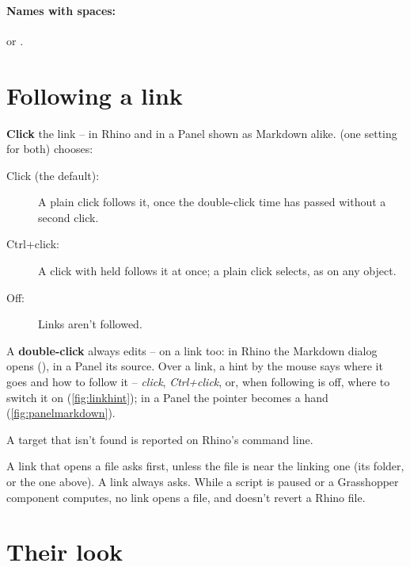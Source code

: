 \paragraph{Names with spaces:}  or .

\section{Following a link}

\textbf{Click} the link -- in Rhino and in a Panel shown as Markdown alike.  (one setting for both) chooses:

\begin{description}
  \item[Click (the default):] A plain click follows it, once the double-click time has passed without a second click.
  \item[Ctrl+click:] A click with  held follows it at once; a plain click selects, as on any object.
  \item[Off:] Links aren't followed.
\end{description}

A \textbf{double-click} always edits -- on a link too: in Rhino the Markdown dialog opens (), in a
Panel its source. Over a link, a hint by the mouse says where it goes and how to follow it -- \emph{click}, \emph{Ctrl+click},
or, when following is off, where to switch it on (\cref{fig:linkhint}); in a Panel the pointer becomes a hand
(\cref{fig:panelmarkdown}).

A target that isn't found is reported on Rhino's command line.


\begin{caution}[Safety]
A link that opens a file asks first, unless the file is near the linking one (its folder, or the one above). A
 link always asks. While a script is paused or a Grasshopper component computes, no link opens a file, and 
doesn't revert a Rhino file.
\end{caution}

\section{Their look}

